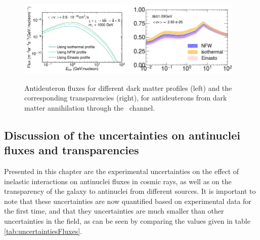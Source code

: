 \begin{figure}[hbtp]
    \centering
    \includegraphics[width=0.48\textwidth]{figures/bbdbarPaperLISDiffProfiles.pdf}
    \includegraphics[width=0.48\textwidth]{figures/Transparency_comparison_DM_profiles_bb51GeV_DMXs_option_nominal.png}
    \caption{Antideuteron fluxes for different dark matter profiles (left) and the corresponding transparencies (right), for antideuterons from dark matter annihilation through the \bb\ channel.}
    \label{fig:different_DM_profiles_and_transparencies}
\end{figure}

\subsection{Discussion of the uncertainties on antinuclei fluxes and transparencies}
Presented in this chapter are the experimental uncertainties on the effect of inelastic interactions on antinuclei fluxes in cosmic rays, as well as on the transparency of the galaxy to antinuclei from different sources. It is important to note that these uncertainties are now quantified based on experimental data for the first time, and that they uncertainties are much smaller than other uncertainties in the field, as can be seen by comparing the values given in table \ref{tab:uncertaintiesFluxes}. \\



